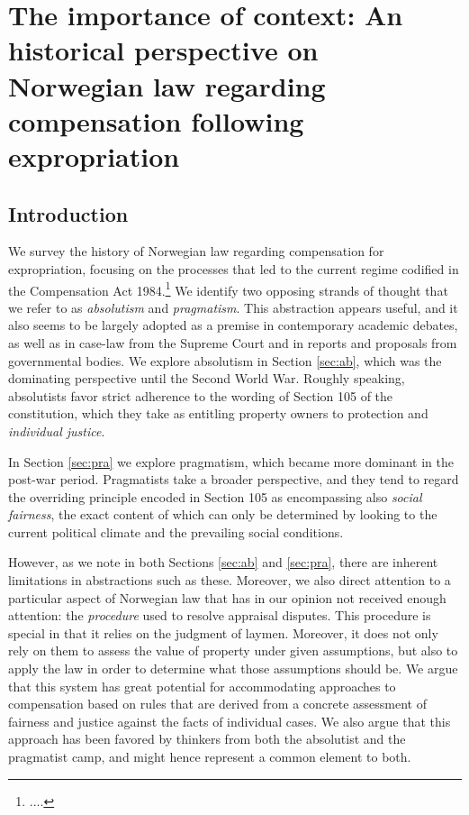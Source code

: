 \chapter{The importance of context: An historical perspective on Norwegian law regarding compensation following expropriation}

\section{Introduction}\label{intro}

We survey the history of Norwegian law regarding compensation for expropriation, focusing on the processes that led to the current regime codified in the Compensation Act 1984.\footnote{....} We identify two opposing strands of thought that we refer to as \emph{absolutism} and \emph{pragmatism}. This abstraction appears useful, and it also seems to be largely adopted as a premise in contemporary academic debates, as well as in case-law from the Supreme Court and in reports and proposals from governmental bodies. We explore absolutism in Section \ref{sec:ab}, which was the dominating perspective until the Second World War. Roughly speaking, absolutists favor strict adherence to the wording of Section 105 of the constitution, which they take as entitling property owners to protection and \emph{individual justice}.  

In Section \ref{sec:pra} we explore pragmatism, which became more dominant in the post-war period. Pragmatists take a broader perspective, and they tend to regard the overriding principle encoded in Section 105 as encompassing also \emph{social fairness}, the exact content of which can only be determined by looking to the current political climate and the prevailing social conditions.

However, as we note in both Sections \ref{sec:ab} and \ref{sec:pra}, there are inherent limitations in abstractions such as these. Moreover, we also direct attention to a particular aspect of Norwegian law that has in our opinion not received enough attention: the \emph{procedure} used to resolve appraisal disputes. This procedure is special in that it relies on the judgment of laymen. Moreover, it does not only rely on them to assess the value of property under given assumptions, but also to apply the law in order to determine what those assumptions should be. We argue that  this system has great potential for accommodating approaches to compensation based on rules that are derived from a concrete assessment of fairness and justice against the facts of individual cases. We also argue that this approach has been favored by thinkers from both the absolutist and the pragmatist camp, and might hence represent a common element to both.

